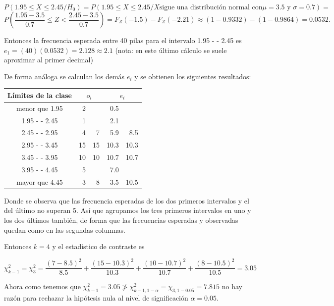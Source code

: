 \documentclass[12pt]{report}
\begin{document}
          $$P(1.95\leq X\leq 2.45/H_{0})=P(1.95\leq X\leq 2.45/X \mbox{sigue una distribución normal
          con}
         \mu=3.5 \mbox{ y } \sigma=0.7)=$$ 
         $$P(\frac{1.95-3.5}{0.7}\leq
         Z<\frac{2.45-3.5}{0.7})=F_{Z}(-1.5)-F_{Z}(-2.21)\approx(1-0.9332)-(1-0.9864)=0.0532.$$

         Entonces la frecuencia esperada entre 40 pilas para el
         intervalo  1.95 - - 2.45 es $e_{1}=(40) (0.0532)=2.128\approx
         2.1$ (nota: en este último cálculo se suele aproximar al
         primer decimal)

         De forma análoga se calculan los demás $e_{i}$ y se obtienen los
         siguientes resultados:
\begin{center}
          \begin{tabular}{|c|rr|rr|}
          \hline
          Límites de la clase &\multicolumn{2}{c|}{$o_{i}$} &
          \multicolumn{2}{c|}{$e_{i}$}\\
          \hline
      menor que  1.95 &   2 &      &   0.5 &      \\
      1.95 - -  2.45 &   1 &      &   2.1 &      \\
      2.45 - -  2.95 &   4 &    7 &   5.9 &   8.5\\
      2.95 - -  3.45 &  15 &   15   &  10.3 &  10.3    \\
      3.45 - -  3.95 &  10 &   10   &  10.7 &   10.7   \\
      3.95 - -  4.45 &   5 &      &   7.0 &      \\
      mayor que 4.45 &   3 &    8 &   3.5 &  10.5\\
      \hline
          \end{tabular}
\end{center}

          Donde se observa que las frecuencia esperadas de los dos
          primeros intervalos y el del último no superan 5. Así que agrupamos
          los tres primeros intervalos en uno y  los dos últimos también,
          de forma que las frecuencias esperadas y observadas quedan
          como en las segundas columnas.

          Entonces $k=4$ y el estadístico de contraste es



          $$\chi_{k-1}^2=\chi_{3}^2=\frac{(7-8.5)^2}{8.5}+\frac{(15-10.3)^2}{10.3}+
          \frac{(10-10.7)^2}{10.7}+\frac{(8-10.5)^2}{10.5}=3.05$$

          Ahora como tenemos que
          $\chi_{k-1}^2=3.05\not>\chi_{k-1,1-\alpha}^2=\chi_{3,1-0.05}=7.815$
          no hay razón para rechazar la hipótesis nula al nivel de
          significación $\alpha=0.05$.
\end{document}
